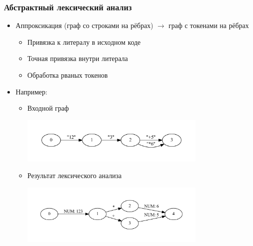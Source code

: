 \documentclass{beamer}
\begin{document}
\begin{frame}[fragile]
	\transwipe[direction=90]
	\frametitle{Абстрактный лексический анализ}
    \begin{itemize}
    	\item Аппроксикация (граф со строками на рёбрах) $\rightarrow$ граф с токенами на рёбрах
    	\begin{itemize}
    	    \item Привязка к литералу в исходном коде
    	    \item Точная привязка внутри литерала
    	    \item Обработка рваных токенов
    	\end{itemize}
    	\item Например:
	    	\begin{itemize}
    	    \item Входной граф
                \begin{center}
                    \includegraphics[width=255pt]{picts/example_calc_break.pdf}
                \end{center}
    	    \item Результат лексического анализа
                \begin{center}
                    \includegraphics[width=255pt]{picts/res_ex_calc_break.pdf}
                \end{center}
    	\end{itemize}
	\end{itemize}
\end{frame}
\end{document}
